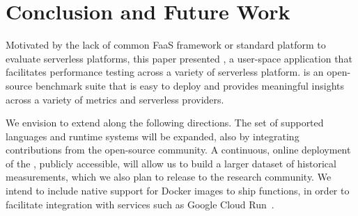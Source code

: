 
\section{Conclusion and Future Work}
\label{sec:conclusion}

Motivated by the lack of common FaaS framework or standard platform to evaluate serverless platforms, this paper presented \sys, a user-space application that facilitates performance testing across a variety of serverless platform.
\sys is an open-source benchmark suite that is easy to deploy and provides meaningful insights across a variety of metrics and serverless providers. 

We envision to extend \sys along the following directions.
The set of supported languages and runtime systems will be expanded, also by integrating contributions from the open-source community.
A continuous, online deployment of the \sys, publicly accessible, will allow us to build a larger dataset of historical measurements, which we also plan to release to the research community.
We intend to include native support for Docker images to ship functions, in order to facilitate integration with services such as Google Cloud Run~\cite{cloudrun}.

